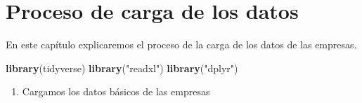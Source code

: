 \documentclass[
  11pt,
  a4paper,
]{book}
\newenvironment{Shaded}{\begin{snugshade}}{\end{snugshade}}
\newcommand{\KeywordTok}[1]{\textcolor[rgb]{0.13,0.29,0.53}{\textbf{#1}}}
\newcommand{\NormalTok}[1]{#1}
\newcommand{\StringTok}[1]{\textcolor[rgb]{0.31,0.60,0.02}{#1}}
\providecommand{\tightlist}{%
  \setlength{\itemsep}{0pt}\setlength{\parskip}{0pt}}
\begin{document}
\hypertarget{proceso-de-carga-de-los-datos}{%
\section{Proceso de carga de los
datos}\label{proceso-de-carga-de-los-datos}}

En este capítulo explicaremos el proceso de la carga de los datos de las
empresas.

\begin{Shaded}
\begin{Highlighting}[]
\KeywordTok{library}\NormalTok{(tidyverse)}
\KeywordTok{library}\NormalTok{(}\StringTok{"readxl"}\NormalTok{)}
\KeywordTok{library}\NormalTok{(}\StringTok{"dplyr"}\NormalTok{)}
\end{Highlighting}
\end{Shaded}

\begin{enumerate}
\def\labelenumi{\arabic{enumi}.}
\tightlist
\item
  Cargamos los datos básicos de las empresas
\end{enumerate}
\end{document}
